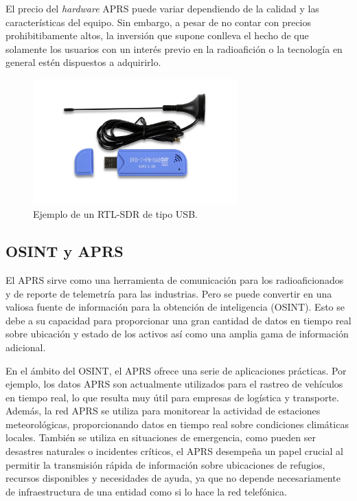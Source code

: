 El precio del \textit{hardware} APRS puede variar dependiendo de la calidad y las características del equipo. Sin embargo, a pesar de no contar con precios prohibitibamente altos, la inversión que supone conlleva el hecho de que solamente los usuarios con un interés previo en la radioafición o la tecnología en general estén dispuestos a adquirirlo.

\begin{figure}[h]
    \centering
    \includegraphics[width=0.7\textwidth]{Imagenes/Chapter_2/rtl_sdr.jpg}
    \caption{Ejemplo de un RTL-SDR de tipo USB.}
    \label{fig:rtl-sdr}
\end{figure}


\subsection{OSINT y APRS}

El APRS sirve como una herramienta de comunicación para los radioaficionados y de reporte de telemetría para las industrias. Pero se puede convertir en una valiosa fuente de información para la obtención de inteligencia (OSINT). Esto se debe a su capacidad para proporcionar una gran cantidad de datos en tiempo real sobre ubicación y estado de los activos así como una amplia gama de información adicional.

En el ámbito del OSINT, el APRS ofrece una serie de aplicaciones prácticas. Por ejemplo, los datos APRS son actualmente utilizados para el rastreo de vehículos en tiempo real, lo que resulta muy útil para empresas de logística y transporte. Además, la red APRS se utiliza para monitorear la actividad de estaciones meteorológicas, proporcionando datos en tiempo real sobre condiciones climáticas locales. También se utiliza en situaciones de emergencia, como pueden ser desastres naturales o incidentes críticos, el APRS desempeña un papel crucial al permitir la transmisión rápida de información sobre ubicaciones de refugios, recursos disponibles y necesidades de ayuda, ya que no depende necesariamente de infraestructura de una entidad como si lo hace la red telefónica.

